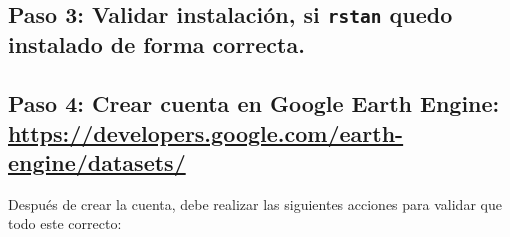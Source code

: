 \documentclass[
  letterpaper,
  DIV=11,
  numbers=noendperiod]{scrartcl}
\newenvironment{Shaded}{\begin{snugshade}}{\end{snugshade}}
\newcommand{\AttributeTok}[1]{\textcolor[rgb]{0.40,0.45,0.13}{#1}}
\newcommand{\CommentTok}[1]{\textcolor[rgb]{0.37,0.37,0.37}{#1}}
\newcommand{\ConstantTok}[1]{\textcolor[rgb]{0.56,0.35,0.01}{#1}}
\newcommand{\DecValTok}[1]{\textcolor[rgb]{0.68,0.00,0.00}{#1}}
\newcommand{\FunctionTok}[1]{\textcolor[rgb]{0.28,0.35,0.67}{#1}}
\newcommand{\NormalTok}[1]{\textcolor[rgb]{0.00,0.23,0.31}{#1}}
\newcommand{\OtherTok}[1]{\textcolor[rgb]{0.00,0.23,0.31}{#1}}
\newcommand{\SpecialCharTok}[1]{\textcolor[rgb]{0.37,0.37,0.37}{#1}}
\newcommand{\StringTok}[1]{\textcolor[rgb]{0.13,0.47,0.30}{#1}}
\begin{document}
\hypertarget{paso-3-validar-instalaciuxf3n-si-rstan-quedo-instalado-de-forma-correcta.}{%
\subsection{\texorpdfstring{Paso 3: Validar instalación, si
\texttt{rstan} quedo instalado de forma
correcta.}{Paso 3: Validar instalación, si rstan quedo instalado de forma correcta.}}\label{paso-3-validar-instalaciuxf3n-si-rstan-quedo-instalado-de-forma-correcta.}}

\begin{Shaded}
\end{Shaded}

\hypertarget{paso-4-crear-cuenta-en-google-earth-engine-httpsdevelopers.google.comearth-enginedatasets}{%
\subsection{\texorpdfstring{Paso 4: Crear cuenta en Google Earth Engine:
\url{https://developers.google.com/earth-engine/datasets/}}{Paso 4: Crear cuenta en Google Earth Engine: https://developers.google.com/earth-engine/datasets/}}\label{paso-4-crear-cuenta-en-google-earth-engine-httpsdevelopers.google.comearth-enginedatasets}}

Después de crear la cuenta, debe realizar las siguientes acciones para
validar que todo este correcto:
\end{document}
